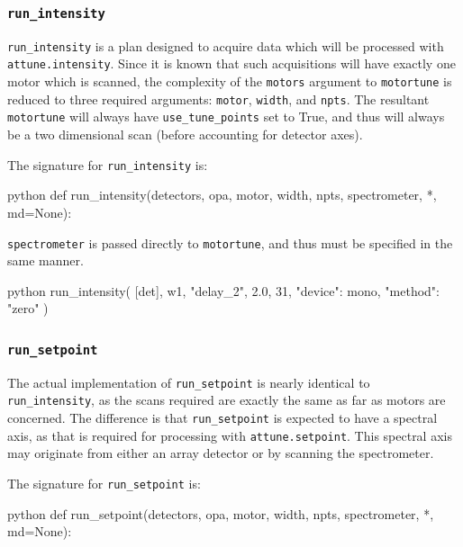 \subsubsection{\texttt{run\_intensity}}

\texttt{run\_intensity} is a plan designed to acquire data which will be processed with \texttt{attune.intensity}.
Since it is known that such acquisitions will have exactly one motor which is scanned, the complexity of the \texttt{motors} argument to \texttt{motortune} is reduced to three required arguments: \texttt{motor}, \texttt{width}, and \texttt{npts}.
The resultant \texttt{motortune} will always have \texttt{use\_tune\_points} set to True, and thus will always be a two dimensional scan (before accounting for detector axes).

The signature for \texttt{run\_intensity} is:

\begin{codefragment}{python}
def run_intensity(detectors, opa, motor, width, npts, spectrometer, *, md=None):
\end{codefragment}

\texttt{spectrometer} is passed directly to \texttt{motortune}, and thus must be specified in the same manner.

\begin{codefragment}{python}
run_intensity(
    [det],
    w1,
    "delay_2",
    2.0,
    31,
    {"device": mono, "method": "zero"}
)
\end{codefragment}

\subsubsection{\texttt{run\_setpoint}}

The actual implementation of \texttt{run\_setpoint} is nearly identical to \texttt{run\_intensity}, as the scans required are exactly the same as far as motors are concerned.
The difference is that \texttt{run\_setpoint} is expected to have a spectral axis, as that is required for processing with \texttt{attune.setpoint}.
This spectral axis may originate from either an array detector or by scanning the spectrometer.

The signature for \texttt{run\_setpoint} is:

\begin{codefragment}{python}
def run_setpoint(detectors, opa, motor, width, npts, spectrometer, *, md=None):
\end{codefragment}


